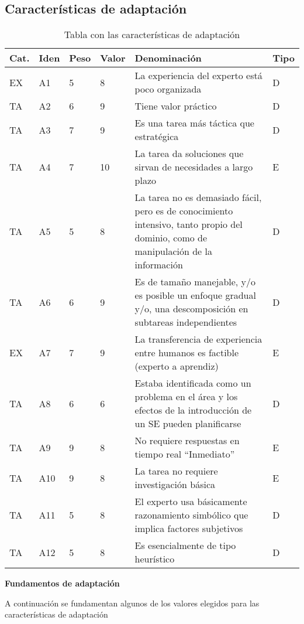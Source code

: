 \subsection{Características de adaptación}
\begin{table}[htb]%
  \centering
  \caption{Tabla con las características de adaptación}
  \label{tab:anchura}
  \begin{tabular}{ | l | l | l | l | p{8cm} | l | }
    \hline
    Cat. & Iden & Peso & Valor & Denominación & Tipo \\ \hline
    EX & A1 & 5 & 8 & La experiencia del experto está poco organizada & D \\ \hline
    TA & A2 & 6 & 9 & Tiene valor práctico & D \\ \hline
    TA & A3 & 7 & 9 & Es una tarea más táctica que estratégica & D \\ \hline
    TA & A4 & 7 & 10 & La tarea da soluciones que sirvan de necesidades a largo plazo & E \\ \hline
    TA & A5 & 5 & 8 & La tarea no es demasiado fácil, pero es de conocimiento intensivo, tanto propio del dominio, como de manipulación de la información & D \\ \hline
    TA & A6 & 6 & 9 & Es de tamaño manejable, y/o es posible un enfoque gradual y/o, una descomposición en subtareas independientes & D \\ \hline
    EX & A7 & 7 & 9 & La transferencia de experiencia entre humanos es factible (experto a aprendiz) & E \\ \hline
    TA & A8 & 6 & 6 & Estaba identificada como un problema en el área y los efectos de la introducción de un SE pueden planificarse & D \\ \hline
    TA & A9 & 9 & 8 & No requiere respuestas en tiempo real “Inmediato” & E \\ \hline
    TA & A10 & 9 & 8 & La tarea no requiere investigación básica & E \\ \hline
    TA & A11 & 5 & 8 & El experto usa básicamente razonamiento simbólico que implica factores subjetivos & D \\ \hline
    TA & A12 & 5 & 8 & Es esencialmente de tipo heurístico & D \\ \hline
  \end{tabular}
\end{table}

\textbf{Fundamentos de adaptación}

A continuación se fundamentan algunos de los valores elegidos para las características de adaptación

